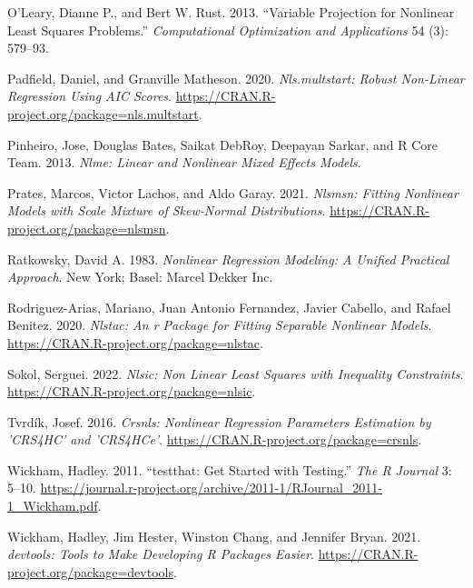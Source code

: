 \documentclass[
]{article}
\newlength{\cslhangindent}
\newlength{\cslentryspacingunit} %
\newenvironment{CSLReferences}[2] %
 {%
  \setlength{\parindent}{0pt}
  \ifodd #1
  \let\oldpar\par
  \def\par{\hangindent=\cslhangindent\oldpar}
  \fi
  \setlength{\parskip}{#2\cslentryspacingunit}
 }%
 {}
\begin{document}
\begin{CSLReferences}{1}{0}
\leavevmode{}%
O'Leary, Dianne P., and Bert W. Rust. 2013. {``Variable Projection for
Nonlinear Least Squares Problems.''} \emph{Computational Optimization
and Applications} 54 (3): 579--93.

\leavevmode{}%
Padfield, Daniel, and Granville Matheson. 2020. \emph{Nls.multstart:
Robust Non-Linear Regression Using AIC Scores}.
\url{https://CRAN.R-project.org/package=nls.multstart}.

\leavevmode{}%
Pinheiro, Jose, Douglas Bates, Saikat DebRoy, Deepayan Sarkar, and R
Core Team. 2013. \emph{Nlme: Linear and Nonlinear Mixed Effects Models}.

\leavevmode{}%
Prates, Marcos, Victor Lachos, and Aldo Garay. 2021. \emph{Nlsmsn:
Fitting Nonlinear Models with Scale Mixture of Skew-Normal
Distributions}. \url{https://CRAN.R-project.org/package=nlsmsn}.

\leavevmode{}%
Ratkowsky, David A. 1983. \emph{Nonlinear Regression Modeling: A Unified
Practical Approach}. New York; Basel: Marcel Dekker Inc.

\leavevmode{}%
Rodriguez-Arias, Mariano, Juan Antonio Fernandez, Javier Cabello, and
Rafael Benitez. 2020. \emph{Nlstac: An r Package for Fitting Separable
Nonlinear Models}. \url{https://CRAN.R-project.org/package=nlstac}.

\leavevmode{}%
Sokol, Serguei. 2022. \emph{Nlsic: Non Linear Least Squares with
Inequality Constraints}. \url{https://CRAN.R-project.org/package=nlsic}.

\leavevmode{}%
Tvrdík, Josef. 2016. \emph{Crsnls: Nonlinear Regression Parameters
Estimation by 'CRS4HC' and 'CRS4HCe'}.
\url{https://CRAN.R-project.org/package=crsnls}.

\leavevmode{}%
Wickham, Hadley. 2011. {``{testthat: Get Started with Testing}.''}
\emph{The R Journal} 3: 5--10.
\url{https://journal.r-project.org/archive/2011-1/RJournal_2011-1_Wickham.pdf}.

\leavevmode{}%
Wickham, Hadley, Jim Hester, Winston Chang, and Jennifer Bryan. 2021.
\emph{{devtools: Tools to Make Developing R Packages Easier}}.
\url{https://CRAN.R-project.org/package=devtools}.

\end{CSLReferences}
\end{document}
